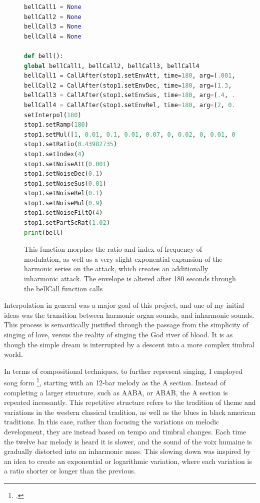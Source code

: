 \documentclass[12pt,twoside,maitrise]{dms_ks}
\theoremstyle{definition}
\begin{document}
{\begin{figure}[H]  
\begin{lstlisting}[language=Python]  
bellCall1 = None  
bellCall2 = None  
bellCall3 = None  
bellCall4 = None

def bell():  
global bellCall1, bellCall2, bellCall3, bellCall4  
bellCall1 = CallAfter(stop1.setEnvAtt, time=180, arg=(.001, .001, .001, .001, 0.001, 0.001, 0.0001, 0.0006, 0.0007, 0.0005, 0.0006, 0.0003, 0.0005, 0.0003, 0.0006, 0.0005, 0.0004, 0.0002, 0.0001, 0.0001)).play()  
bellCall2 = CallAfter(stop1.setEnvDec, time=180, arg=(1.3, .05, .02, 0, 0, 0.04, .004, 0.04, .04, 0.04, .04, 0.04, .04, 0.04, .04, 0.04, .04, 0.04, .04, 0.04)).play()  
bellCall3 = CallAfter(stop1.setEnvSus, time=180, arg=(.4, .1, .02, .01, .01, 0.01, .01, 0.01, .01, 0.01, .01, 0.01, .01, 0.01, .01, 0.01, .01, 0.01, .002, 0.002)).play()  
bellCall4 = CallAfter(stop1.setEnvRel, time=180, arg=(2, 0.1, 0.1, .01, .03, 0.4, .04, 0.04, .04, 0.04, .04, 0.04, .04, 0.04, .04, 0.4, .04, 0.04, .04, 0.4)).play()  
setInterpol(180)  
stop1.setRamp(180)  
stop1.setMul([1, 0.01, 0.1, 0.01, 0.07, 0, 0.02, 0, 0.01, 0, 0.003, 0, 0.003, 0, 0.001, 0, 0.001, 0, 0.001, 0])  
stop1.setRatio(0.43982735)  
stop1.setIndex(4)  
stop1.setNoiseAtt(0.001)  
stop1.setNoiseDec(0.1)  
stop1.setNoiseSus(0.01)  
stop1.setNoiseRel(0.1)  
stop1.setNoiseMul(0.9)  
stop1.setNoiseFiltQ(4)  
stop1.setPartScRat(1.02)  
print(bell)  
\end{lstlisting}  
\caption{This function morphes the ratio and index of frequency of modulation, as well as a very slight exponential expansion of the harmonic series on the attack, which creates an additionally inharmonic attack. The envelope is altered after 180 seconds through the bellCall function calls}  
\end{figure}

Interpolation in general was a major goal of this project, and one of my initial ideas was the transition between harmonic organ sounds, and inharmonic sounds.  
This process is semantically justified through the passage from the simplicity of singing of love, versus the reality of singing the God river of blood.  
It is as though the simple dream is interrupted by a descent into a more complex timbral world.

In terms of compositional techniques, to further represent singing, I employed song form \footcite{owens_forms_2003}, starting with an 12-bar melody as the A section.
Instead of completing a larger structure, such as AABA, or ABAB, the A section is repeated incessantly.
This repetitive structure refers to the tradition of theme and variations in the western classical tradition, as well as the blues in black american traditions.  
In this case, rather than focusing the variations on melodic development, they are instead based on tempo and timbral changes. 
Each time the twelve bar melody is heard it is slower, and the sound of the voix humaine is gradually distorted into an inharmonic mass.
This slowing down was inspired by an idea to create an exponential or logarithmic variation, where each variation is a ratio shorter or longer than the previous.

}
\end{document}

